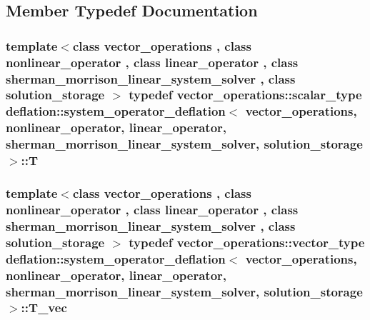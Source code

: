 \subsection{Member Typedef Documentation}
\hypertarget{classdeflation_1_1system__operator__deflation_ac9c012537cdfa0be8c8ebda025dd71ba}{
\subsubsection[{T}]{\setlength{\rightskip}{0pt plus 5cm}template$<$class vector\-\_\-operations , class nonlinear\-\_\-operator , class linear\-\_\-operator , class sherman\-\_\-morrison\-\_\-linear\-\_\-system\-\_\-solver , class solution\-\_\-storage $>$ typedef {\bf vector\-\_\-operations\-::scalar\-\_\-type} {\bf deflation\-::system\-\_\-operator\-\_\-deflation}$<$ {\bf vector\-\_\-operations}, nonlinear\-\_\-operator, linear\-\_\-operator, sherman\-\_\-morrison\-\_\-linear\-\_\-system\-\_\-solver, {\bf solution\-\_\-storage} $>$\-::{\bf T}}}\label{classdeflation_1_1system__operator__deflation_ac9c012537cdfa0be8c8ebda025dd71ba}
\hypertarget{classdeflation_1_1system__operator__deflation_a049936d7a4abda90adcccdc8ff56e186}{
\subsubsection[{T\-\_\-vec}]{\setlength{\rightskip}{0pt plus 5cm}template$<$class vector\-\_\-operations , class nonlinear\-\_\-operator , class linear\-\_\-operator , class sherman\-\_\-morrison\-\_\-linear\-\_\-system\-\_\-solver , class solution\-\_\-storage $>$ typedef {\bf vector\-\_\-operations\-::vector\-\_\-type} {\bf deflation\-::system\-\_\-operator\-\_\-deflation}$<$ {\bf vector\-\_\-operations}, nonlinear\-\_\-operator, linear\-\_\-operator, sherman\-\_\-morrison\-\_\-linear\-\_\-system\-\_\-solver, {\bf solution\-\_\-storage} $>$\-::{\bf T\-\_\-vec}}}\label{classdeflation_1_1system__operator__deflation_a049936d7a4abda90adcccdc8ff56e186}


